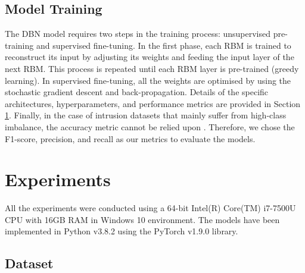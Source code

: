 \documentclass[runningheads]{llncs}
\begin{document}
\subsection{Model Training}
\label{subsec:model training}
The \ac{DBN} model requires two steps in the training process: unsupervised pre-training and supervised fine-tuning. In the first phase, each \ac{RBM} is trained to reconstruct its input by adjusting its weights and feeding the input layer of the next \ac{RBM}. This process is repeated until each \ac{RBM} layer is pre-trained (greedy learning). In supervised fine-tuning, all the weights are optimised by using the stochastic gradient descent and back-propagation.
Details of the specific architectures, hyperparameters, and performance metrics are provided in Section \ref{sec:experiments}. 
Finally, in the case of intrusion datasets that mainly suffer from high-class imbalance, the accuracy metric cannot be relied upon \cite{Galar}. Therefore, we chose the F1-score, precision, and recall as our metrics to evaluate the models. \section{Experiments}
\label{sec:experiments}

All the experiments were conducted using a 64-bit Intel(R) Core(TM) i7-7500U CPU with 16GB RAM in Windows 10 environment. The models have been implemented in Python v3.8.2 using the PyTorch v1.9.0 library.

\subsection{Dataset}
\label{subsec:dataset}
\end{document}
